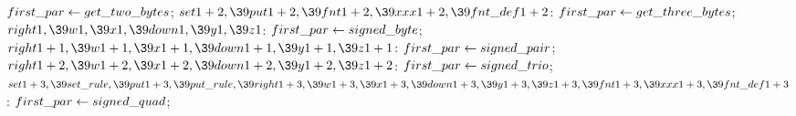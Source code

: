 $\\{first\_par}\gets\\{get\_two\_bytes}$;\6
\4$\\{set1}+2,\39\\{put1}+2,\39\\{fnt1}+2,\39\\{xxx1}+2,\39\\{fnt\_def1}+2$: %
$\\{first\_par}\gets\\{get\_three\_bytes}$;\6
\4$\\{right1},\39\\{w1},\39\\{x1},\39\\{down1},\39\\{y1},\39\\{z1}$: $%
\\{first\_par}\K\\{signed\_byte}$;\6
\4$\\{right1}+1,\39\\{w1}+1,\39\\{x1}+1,\39\\{down1}+1,\39\\{y1}+1,\39%
\\{z1}+1$: $\\{first\_par}\gets\\{signed\_pair}$;\6
\4$\\{right1}+2,\39\\{w1}+2,\39\\{x1}+2,\39\\{down1}+2,\39\\{y1}+2,\39%
\\{z1}+2$: $\\{first\_par}\gets\\{signed\_trio}$;\6
\4$\\{set1}+3,\39\\{set\_rule},\39\\{put1}+3,\39\\{put\_rule},\39\\{right1}+3,%
\39\\{w1}+3,\39\\{x1}+3,\39\\{down1}+3,\39\\{y1}+3,\39\\{z1}+3,\39\\{fnt1}+3,%
\39\\{xxx1}+3,\39\\{fnt\_def1}+3$: $\\{first\_par}\gets\\{signed\_quad}$;\6
